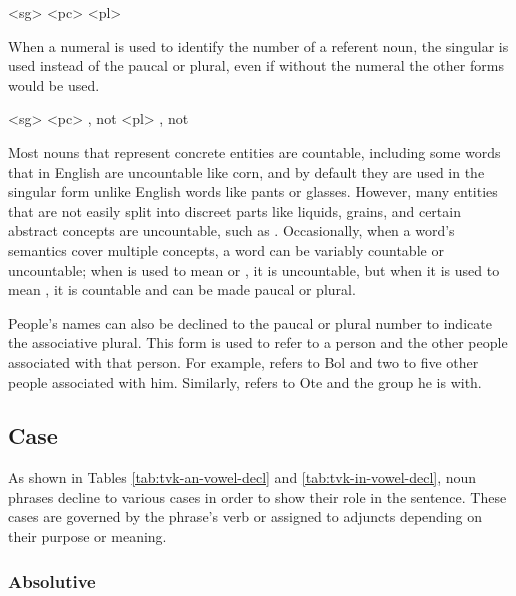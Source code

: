 	\a<sg>    
	\a<pc>    
	\a<pl>    
\xe

When a numeral is used to identify the number of a referent noun, the singular is used instead of the paucal or plural, even if without the numeral the other forms would be used\autocite{wals-34}.

	\a<sg>    
	\a<pc>    , not 
	\a<pl>    , not 
\xe

Most nouns that represent concrete entities are countable, including some words that in English are uncountable like corn, and by default they are used in the singular form unlike English words like pants or glasses. However, many entities that are not easily split into discreet parts like liquids, grains, and certain abstract concepts are uncountable, such as   . Occasionally, when a word's semantics cover multiple concepts, a word can be variably countable or uncountable; when   is used to mean  or , it is uncountable, but when it is used to mean , it is countable and can be made paucal or plural.

People's names can also be declined to the paucal or plural number to indicate the associative plural\autocite{wals-36}. This form is used to refer to a person and the other people associated with that person. For example,    refers to Bol and two to five other people associated with him. Similarly,    refers to Ote and the group he is with.

\subsection{Case}
\label{subsec:tvk-nouns-case}

As shown in Tables \ref{tab:tvk-an-vowel-decl} and \ref{tab:tvk-in-vowel-decl}, \langtvk{} noun phrases decline to various cases in order to show their role in the sentence. These cases are governed by the phrase's verb or assigned to adjuncts depending on their purpose or meaning.

\subsubsection{Absolutive}
\label{subsubsec:tvk-nouns-absolutive}

